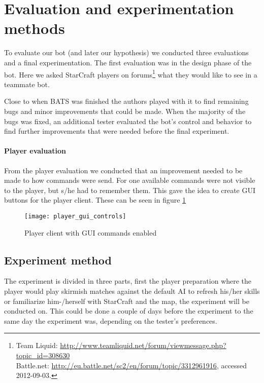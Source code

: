 \section{Evaluation and experimentation methods}
To evaluate our bot (and later our hypothesis) we conducted three evaluations and a final experimentation. The first evaluation was in the design phase of the bot. Here we asked StarCraft players on forums\footnote{
Team Liquid: \url{http://www.teamliquid.net/forum/viewmessage.php?topic_id=308630}\\
Battle.net: \url{http://eu.battle.net/sc2/en/forum/topic/3312961916}, accessed 2012-09-03.} what they would like to see in a teammate bot.

Close to when BATS was finished the authors played with it to find remaining bugs and minor improvements that could be made. When the majority of the bugs was fixed, an additional tester evaluated the bot’s control and behavior to find further improvements that were needed before the final experiment.

\paragraph{Player evaluation}
From the player evaluation we conducted that an improvement needed to be made to how commands were send. For one available commands were not visible to the player, but s/he had to remember them. This gave the idea to create GUI buttons for the player client. These can be seen in figure \ref{fig:player_commands_gui}

\begin{figure}[htb]
\centering
\texttt{[image: player\_gui\_controls]}
\caption{Player client with GUI commands enabled}
\label{fig:player_commands_gui}
\end{figure}

\subsection{Experiment method}
The experiment is divided in three parts, first the player preparation where the player would play skirmish matches against the default AI to refresh his/her skills or familiarize him-/herself with StarCraft and the map, the experiment will be conducted on. This could be done a couple of days before the experiment to the same day the experiment was, depending on the tester’s preferences.


